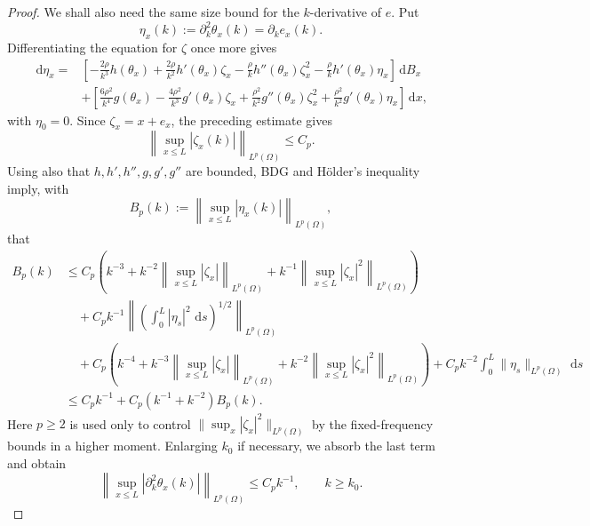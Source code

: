\documentclass[11pt]{article}
\newcommand{\dd}{\,\mathrm d}
\begin{document}
\begin{proof}
We shall also need the same size bound for the $k$-derivative of $e$. Put
\[
    \eta_x(k):=\partial_k^2\theta_x(k)=\partial_k e_x(k).
\]
Differentiating the equation for $\zeta$ once more gives
\[
\begin{aligned}
\dd\eta_x={}&
\left[-\frac{2\rho}{k^3}h(\theta_x)
      +\frac{2\rho}{k^2}h'(\theta_x)\zeta_x
      -\frac{\rho}{k}h''(\theta_x)\zeta_x^2
      -\frac{\rho}{k}h'(\theta_x)\eta_x\right]\dd B_x \\
&+\left[\frac{6\rho^2}{k^4}g(\theta_x)
      -\frac{4\rho^2}{k^3}g'(\theta_x)\zeta_x
      +\frac{\rho^2}{k^2}g''(\theta_x)\zeta_x^2
      +\frac{\rho^2}{k^2}g'(\theta_x)\eta_x\right]\dd x,
\end{aligned}
\]
with $\eta_0=0$. Since $\zeta_x=x+e_x$, the preceding estimate gives
\[
    \left\|\sup_{x\le L}|\zeta_x(k)|\right\|_{L^p(\Omega)}\le C_p.
\]
Using also that $h,h',h'',g,g',g''$ are bounded, BDG and H\"older's inequality imply, with
\[
    B_p(k):=\left\|\sup_{x\le L}|\eta_x(k)|\right\|_{L^p(\Omega)},
\]
that
\[
\begin{aligned}
B_p(k)
&\le C_p\left(k^{-3}+k^{-2}\left\|\sup_{x\le L}|\zeta_x|\right\|_{L^p(\Omega)}
        +k^{-1}\left\|\sup_{x\le L}|\zeta_x|^2\right\|_{L^p(\Omega)}\right) \\
&\quad +C_p k^{-1}
   \left\|\left(\int_0^L |\eta_s|^2\,\dd s\right)^{1/2}\right\|_{L^p(\Omega)} \\
&\quad +C_p\left(k^{-4}+k^{-3}\left\|\sup_{x\le L}|\zeta_x|\right\|_{L^p(\Omega)}
        +k^{-2}\left\|\sup_{x\le L}|\zeta_x|^2\right\|_{L^p(\Omega)}\right)
      +C_p k^{-2}\int_0^L\|\eta_s\|_{L^p(\Omega)}\,\dd s  \\
&\le C_p k^{-1}+C_p(k^{-1}+k^{-2})B_p(k).
\end{aligned}
\]
Here $p\ge2$ is used only to control $\|\sup_x|\zeta_x|^2\|_{L^p(\Omega)}$ by the fixed-frequency bounds in a higher moment. Enlarging $k_0$ if necessary, we absorb the last term and obtain
\begin{equation}\label{eq:eta-fixed-bound}
    \left\|\sup_{x\le L}|\partial_k^2\theta_x(k)|\right\|_{L^p(\Omega)}
    \le C_p k^{-1},
    \qquad k\ge k_0 .
\end{equation}


\end{proof}
\end{document}
